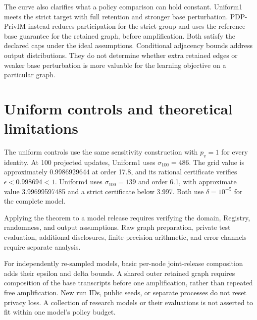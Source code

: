 The curve also clarifies what a policy comparison can hold constant. Uniform1 meets the strict target with full retention and stronger base perturbation. PDP-PrivIM instead reduces participation for the strict group and uses the reference base guarantee for the retained graph, before amplification. Both satisfy the declared caps under the ideal assumptions. Conditional adjacency bounds address output distributions. They do not determine whether extra retained edges or weaker base perturbation is more valuable for the learning objective on a particular graph.

\section{Uniform controls and theoretical limitations}\label{sec:uniform-bounds}
The uniform controls use the same sensitivity construction with $p_v=1$ for every identity. At 100 projected updates, Uniform1 uses $\sigma_{100}=486$. The grid value is approximately 0.9986929644 at order 17.8, and its rational certificate verifies $\epsilon<0.998694<1$. Uniform4 uses $\sigma_{100}=139$ and order 6.1, with approximate value 3.99699597485 and a strict certificate below 3.997. Both use $\delta=10^{-5}$ for the complete model.

Applying the theorem to a model release requires verifying the domain, Registry, randomness, and output assumptions. Raw graph preparation, private test evaluation, additional disclosures, finite-precision arithmetic, and error channels require separate analysis.

For independently re-sampled models, basic per-node joint-release composition adds their epsilon and delta bounds. A shared outer retained graph requires composition of the base transcripts before one amplification, rather than repeated free amplification. New run IDs, public seeds, or separate processes do not reset privacy loss. A collection of research models or their evaluations is not asserted to fit within one model's policy budget.
